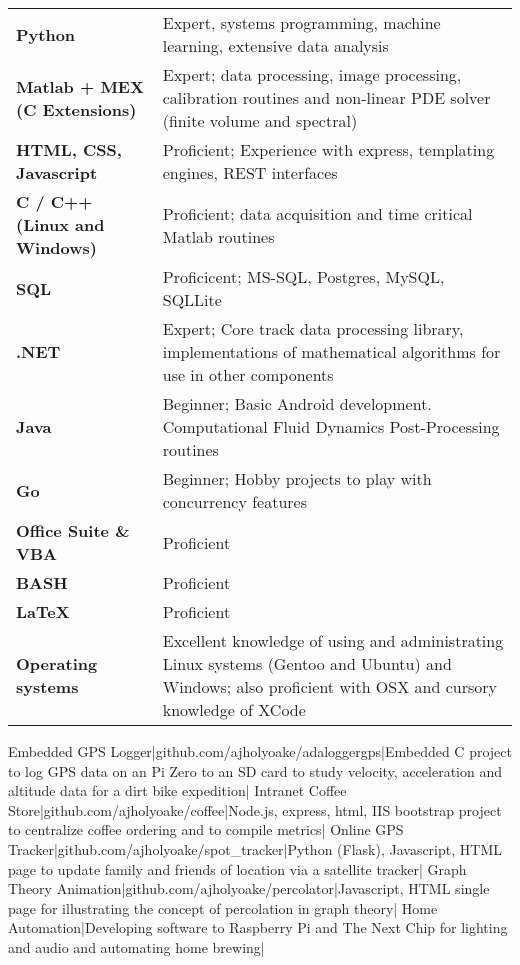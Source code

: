 \documentclass[a4paper,10pt]{article}
\begin{document}
\begin{tabular}{p{2.8in}p{3.3in}}
\textbf{Python} & Expert, systems programming, machine learning, extensive data analysis \\
\textbf{Matlab + MEX (C Extensions)} & Expert; data processing, image processing, calibration routines and non-linear PDE solver (finite volume and spectral)\\
\textbf{HTML, CSS, Javascript} & Proficient; Experience with express, templating engines, REST interfaces\\
\textbf{C / C++ (Linux and Windows)}     & Proficient; data acquisition and time critical Matlab routines\\
\textbf{SQL} & Proficicent; MS-SQL, Postgres, MySQL, SQLLite \\
\textbf{.NET} & Expert; Core track data processing library, implementations of mathematical algorithms for use in other components \\
\textbf{Java} & Beginner; Basic Android development. Computational Fluid Dynamics Post-Processing routines\\
\textbf{Go} & Beginner; Hobby projects to play with concurrency features\\
\textbf{Office Suite \& VBA} & Proficient\\
\textbf{BASH}   & Proficient\\
\textbf{\LaTeX} & Proficient\\
\textbf{Operating systems} & Excellent knowledge of using and administrating Linux systems (Gentoo and Ubuntu) and  Windows; also proficient with OSX and cursory knowledge of XCode \\
\end{tabular}
\newline
\lineunder

\begin{2colsection}[Projects]
\Rcc Embedded GPS Logger|github.com/ajholyoake/adaloggergps|Embedded C project
to log GPS data on an Pi Zero to an SD card to study velocity, acceleration and
altitude data for a dirt bike expedition|
\Rcc Intranet Coffee Store|github.com/ajholyoake/coffee|Node.js, express, html, IIS
bootstrap project to centralize coffee ordering and to compile metrics|
\Rcc Online GPS Tracker|github.com/ajholyoake/spot\_tracker|Python (Flask),
Javascript, HTML page to update family and friends of location via a satellite tracker|
\Rcc Graph Theory Animation|github.com/ajholyoake/percolator|Javascript, HTML
single page for illustrating the concept of percolation in graph theory|
\Rc Home Automation|Developing software to Raspberry Pi and The Next Chip for
lighting and audio and automating home brewing|
\end{2colsection}
\end{document}
